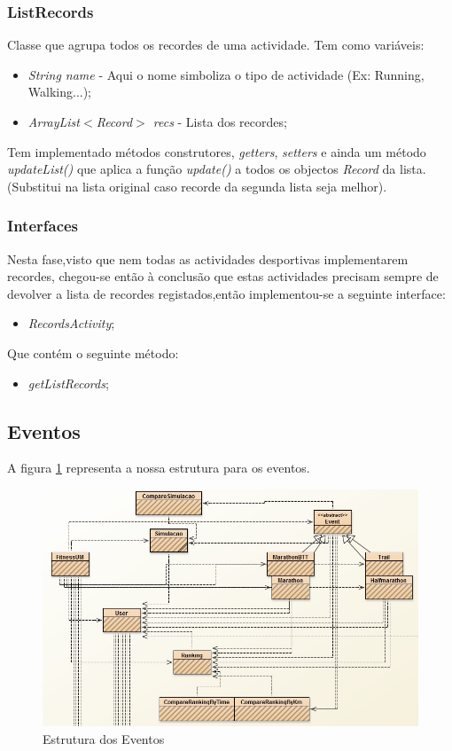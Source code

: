 \documentclass[12pt,notitlepage]{article}
\begin{document}
\subsubsection{ListRecords}

Classe que agrupa todos os recordes de uma actividade. Tem como variáveis:
\begin{itemize}
\item \textit{String name} - Aqui o nome simboliza o tipo de actividade (Ex: Running, Walking...);
\item \textit{ArrayList$<$Record$>$ recs} - Lista dos recordes;
\end{itemize}
Tem implementado métodos construtores, \textit{getters}, \textit{setters} e ainda um método \textit{updateList()} que aplica a função \textit{update()} a todos os objectos \textit{Record} da lista. (Substitui na lista original caso recorde da segunda lista seja melhor).
\subsubsection{Interfaces}
Nesta fase,visto que nem todas as actividades desportivas implementarem recordes, chegou-se então à conclusão que estas actividades precisam sempre de devolver a lista de recordes registados,então implementou-se a seguinte interface:
\begin{itemize}
\item \textit{RecordsActivity};
\end{itemize}
Que contém o seguinte método:
\begin{itemize}
\item \textit{getListRecords};
\end{itemize}

\subsection{Eventos}
A figura \ref{fig:eventos} representa a nossa estrutura para os eventos.


\begin{figure}[h]
\centering
\includegraphics[scale=0.6]{simula.jpg}
\caption{Estrutura dos Eventos}
\label{fig:eventos}
\end{figure}
\end{document}
